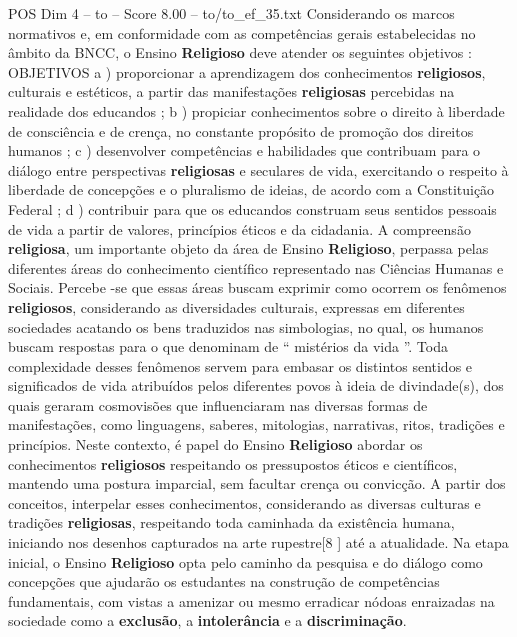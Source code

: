 \begin{textsample}{POS Dim 4 – to – Score 8.00 – to/to\_ef\_35.txt}  \label{ex:f4_pos_206}
Considerando os marcos normativos e, em conformidade com as competências gerais estabelecidas no âmbito da BNCC, o Ensino \textbf{Religioso} deve atender os seguintes objetivos : OBJETIVOS a ) proporcionar a aprendizagem dos conhecimentos \textbf{religiosos}, culturais e estéticos, a partir das manifestações \textbf{religiosas} percebidas na realidade dos educandos ; b ) propiciar conhecimentos sobre o direito à liberdade de consciência e de crença, no constante propósito de promoção dos direitos humanos ; c ) desenvolver competências e habilidades que contribuam para o diálogo entre perspectivas \textbf{religiosas} e seculares de vida, exercitando o respeito à liberdade de concepções e o pluralismo de ideias, de acordo com a Constituição Federal ; d ) contribuir para que os educandos construam seus sentidos pessoais de vida a partir de valores, princípios éticos e da cidadania.
A compreensão \textbf{religiosa}, um importante objeto da área de Ensino \textbf{Religioso}, perpassa pelas diferentes áreas do conhecimento científico representado nas Ciências Humanas e Sociais.
Percebe -se que essas áreas buscam exprimir como ocorrem os fenômenos \textbf{religiosos}, considerando as diversidades culturais, expressas em diferentes sociedades acatando os bens traduzidos nas simbologias, no qual, os humanos buscam respostas para o que denominam de “ mistérios da vida ”.
Toda complexidade desses fenômenos servem para embasar os distintos sentidos e significados de vida atribuídos pelos diferentes povos à ideia de divindade(s), dos quais geraram cosmovisões que influenciaram nas diversas formas de manifestações, como linguagens, saberes, mitologias, narrativas, ritos, tradições e princípios.
Neste contexto, é papel do Ensino \textbf{Religioso} abordar os conhecimentos \textbf{religiosos} respeitando os pressupostos éticos e científicos, mantendo uma postura imparcial, sem facultar crença ou convicção.
A partir dos conceitos, interpelar esses conhecimentos, considerando as diversas culturas e tradições \textbf{religiosas}, respeitando toda caminhada da existência humana, iniciando nos desenhos capturados na arte rupestre[8 ] até a atualidade.
Na etapa inicial, o Ensino \textbf{Religioso} opta pelo caminho da pesquisa e do diálogo como concepções que ajudarão os estudantes na construção de competências fundamentais, com vistas a amenizar ou mesmo erradicar nódoas enraizadas na sociedade como a \textbf{exclusão}, a \textbf{intolerância} e a \textbf{discriminação}.

\end{textsample}
